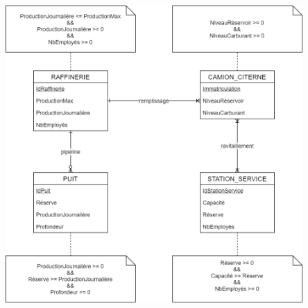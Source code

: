 \documentclass[a4paper]{article}
\begin{document}
\begin{center}
    \includegraphics[width=0.85\textwidth]{images/RoumacheGregoire_ERD.png}
\end{center}
\end{document}
